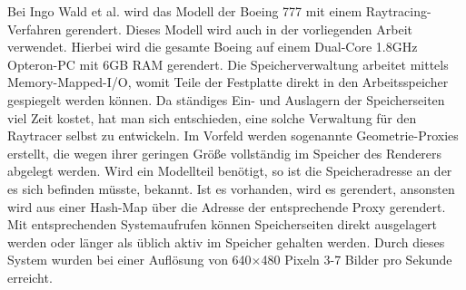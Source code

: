 Bei Ingo Wald et al. \cite{wald} wird das Modell der Boeing 777 mit einem Raytracing-Verfahren gerendert. Dieses Modell wird auch in der vorliegenden Arbeit verwendet. Hierbei wird die gesamte Boeing auf einem Dual-Core 1.8GHz Opteron-PC mit 6GB RAM gerendert. Die Speicherverwaltung arbeitet mittels Memory-Mapped-I/O, womit Teile der Festplatte direkt in den Arbeitsspeicher gespiegelt werden können. Da ständiges Ein- und Auslagern der Speicherseiten viel Zeit kostet, hat man sich entschieden, eine solche Verwaltung für den Raytracer selbst zu entwickeln. Im Vorfeld werden sogenannte Geometrie-Proxies erstellt, die wegen ihrer geringen Größe vollständig im Speicher des Renderers abgelegt werden. Wird ein Modellteil benötigt, so ist die Speicheradresse an der es sich befinden müsste, bekannt. Ist es vorhanden, wird es gerendert, ansonsten wird aus einer Hash-Map über die Adresse der entsprechende Proxy gerendert. Mit entsprechenden Systemaufrufen können Speicherseiten direkt ausgelagert werden oder länger als üblich aktiv im Speicher gehalten werden. Durch dieses System wurden bei einer Auflösung von 640$\times$480 Pixeln 3-7 Bilder pro Sekunde erreicht.


%
